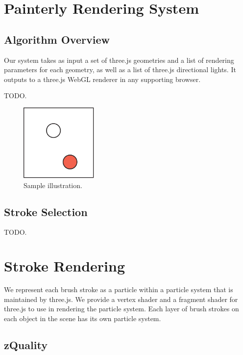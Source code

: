 \documentclass[conference]{acmsiggraph}
\begin{document}
\section{Painterly Rendering System}

\subsection{Algorithm Overview}

Our system takes as input a set of three.js geometries and a list of rendering
parameters for each geometry, as well as a list of three.js directional lights.
It outputs to a three.js WebGL renderer in any supporting browser.

TODO.

\begin{figure}[ht]
  \centering
  \includegraphics[width=1.5in]{images/samplefigure}
  \caption{Sample illustration.}
\end{figure}

\subsection{Stroke Selection}

TODO.

\section{Stroke Rendering}

We represent each brush stroke as a particle within a particle system that is
maintained by three.js. We provide a vertex shader and a fragment shader for
three.js to use in rendering the particle system. Each layer of brush strokes
on each object in the scene has its own particle system.

\subsection{zQuality}
\end{document}
